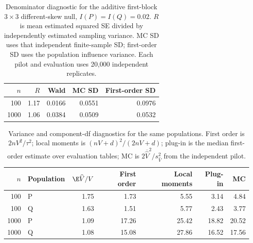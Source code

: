 \begin{table}[htbp]
\centering\small
\caption{Denominator diagnostic for the additive first-block $3\times3$ different-skew null, $I(P)=I(Q)=0.02$. $R$ is mean estimated squared SE divided by independently estimated sampling variance. MC SD uses that independent finite-sample SD; first-order SD uses the population influence variance. Each pilot and evaluation uses 20,000 independent replicates.}
\label{tab:denominator-check}
\begin{tabular}{rrrrr}
\toprule
$n$ & $R$ & Wald & MC SD & First-order SD\\
\midrule
100 & 1.17 & 0.0166 & 0.0551 & 0.0976 \\
1000 & 1.06 & 0.0384 & 0.0509 & 0.0532 \\
\bottomrule
\end{tabular}
\end{table}
\begin{table}[htbp]
\centering\small
\caption{Variance and component-df diagnostics for the same populations. First order is $2nV^2/\tau^2$; local moments is $(nV+d)^2/(2nV+d)$; plug-in is the median first-order estimate over evaluation tables; MC is $2\overline{\widehat V}^{2}/s^2_{\widehat V}$ from the independent pilot.}
\label{tab:component-check}
\begin{tabular}{rlrrrrr}
\toprule
$n$ & Population & $\E\widehat V/V$ & First order & Local moments & Plug-in & MC\\
\midrule
100 & P & 1.75 & 1.73 & 5.55 & 3.14 & 4.84 \\
100 & Q & 1.63 & 1.51 & 5.77 & 2.43 & 3.77 \\
1000 & P & 1.09 & 17.26 & 25.42 & 18.82 & 20.52 \\
1000 & Q & 1.08 & 15.08 & 27.86 & 16.52 & 17.56 \\
\bottomrule
\end{tabular}
\end{table}
